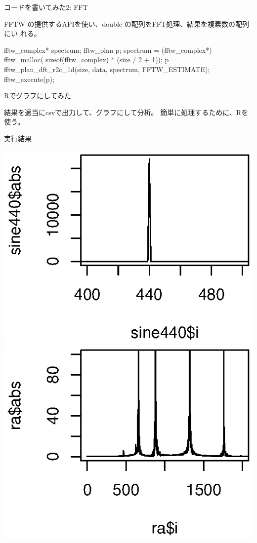 \begin{frame}[containsverbatim]{コードを書いてみた2: FFT}

FFTW の提供するAPIを使い、double の配列をFFT処理、結果を複素数の配列にい
れる。

\begin{commandline}
  fftw_complex* spectrum;
  fftw_plan p;
  spectrum = (fftw_complex*) fftw_malloc(
    sizeof(fftw_complex) * (size / 2 + 1));
  p = fftw_plan_dft_r2c_1d(size, data, spectrum, FFTW_ESTIMATE);
  fftw_execute(p);
\end{commandline} 
\end{frame}

\begin{frame}[containsverbatim]{Rでグラフにしてみた}

結果を適当にcsvで出力して、グラフにして分析。
簡単に処理するために、Rを使う。


\end{frame}

\begin{frame}{実行結果}

 \includegraphics[width=0.5\hsize]{image201003/sine.eps}
 \includegraphics[width=0.5\hsize]{image201003/ra.eps}
 
\end{frame}

